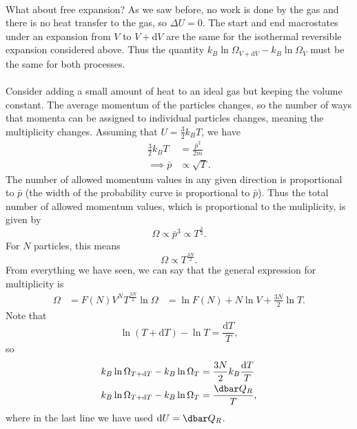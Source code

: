 \documentclass[../thermodynamics.tex]{subfiles}
\begin{document}
        \paragraph{}
        What about free expansion?
        As we saw before, no work is done by the gas and there is no heat transfer to the gas, so $\Delta U=0$.
        The start and end macrostates under an expansion from $V$ to $V+\mathrm{d}V$ are the same for the isothermal reversible expansion considered above.
        Thus the quantity $k_B\ln\Omega_{V+\mathrm{d}V}-k_B\ln\Omega_V$ must be the same for both processes.

        \paragraph{}
        Consider adding a small amount of heat to an ideal gas but keeping the volume constant.
        The average momentum of the particles changes, so the number of ways that momenta can be assigned to individual particles changes, meaning the multiplicity changes.
        Assuming that $U=\frac{3}{2}k_BT$, we have
        \begin{align}
            \frac{3}{2}k_BT&=\frac{\bar{p}^2}{2m}\\
            \implies\bar{p}&\propto\sqrt{T}.
        \end{align}
        The number of allowed momentum values in any given direction is proportional to $\bar{p}$ (the width of the probability curve is proportional to $\bar{p}$).
        Thus the total number of allowed momentum values, which is proportional to the muliplicity, is given by
        \begin{equation}
            \Omega\propto\bar{p}^3\propto T^\frac{3}{2}.
        \end{equation}
        For $N$ particles, this means
        \begin{equation}
            \Omega\propto T^\frac{3N}{2}.
        \end{equation}
        From everything we have seen, we can say that the general expression for multiplicity is
        \begin{align}
            \Omega&=F(N)V^NT^\frac{3N}{2}
            \ln\Omega&=\ln F(N)+N\ln V+\frac{3N}{2}\ln T.
        \end{align}
        Note that
        \begin{equation}
            \ln(T+\mathrm{d}T)-\ln T=\frac{\mathrm{d}T}{T},
        \end{equation}
        so
        \begin{align}
            k_B\ln\Omega_{T+\mathrm{d}T}-k_B\ln\Omega_T&=\frac{3N}{2}k_B\frac{\mathrm{d}T}{T}\\
            k_B\ln\Omega_{T+\mathrm{d}T}-k_B\ln\Omega_T&=\frac{\dbar Q_R}{T},
        \end{align}
        where in the last line we have used $\mathrm{d}U=\dbar Q_R$.
\end{document}
